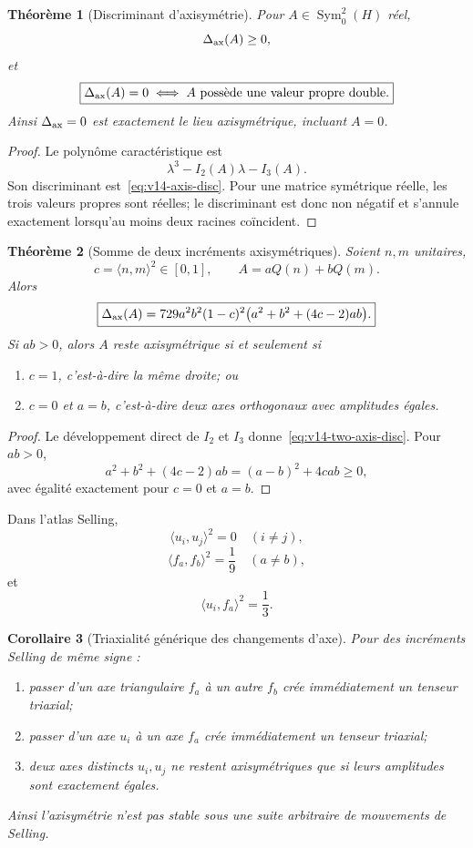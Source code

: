 \documentclass[11pt,a4paper]{article}
\newtheorem{theorem}{Théorème}[section]
\newtheorem{corollary}[theorem]{Corollaire}
\begin{document}
\begin{theorem}[Discriminant d'axisymétrie]\label{thm:v14-axis-disc}
Pour $A\in\operatorname{Sym}_0^2(H)$ réel,
\[
 \Delta_{\rm ax}(A)\ge0,
\]
et
\[
 \boxed{
 \Delta_{\rm ax}(A)=0
 \iff
 A\ \text{possède une valeur propre double}.}
\]
Ainsi $\Delta_{\rm ax}=0$ est exactement le lieu axisymétrique, incluant $A=0$.
\end{theorem}

\begin{proof}
Le polynôme caractéristique est
\[
 \lambda^3-I_2(A)\lambda-I_3(A).
\]
Son discriminant est~\eqref{eq:v14-axis-disc}. Pour une matrice symétrique réelle, les trois valeurs propres sont réelles; le discriminant est donc non négatif et s'annule exactement lorsqu'au moins deux racines coïncident.
\end{proof}

\begin{theorem}[Somme de deux incréments axisymétriques]\label{thm:v14-two-axis}
Soient $n,m$ unitaires,
\[
 c=\langle n,m\rangle^2\in[0,1],
\qquad
 A=aQ(n)+bQ(m).
\]
Alors
\begin{equation}\label{eq:v14-two-axis-disc}
 \boxed{
 \Delta_{\rm ax}(A)
 =
 729a^2b^2(1-c)^2
 \bigl(a^2+b^2+(4c-2)ab\bigr).}
\end{equation}
Si $ab>0$, alors $A$ reste axisymétrique si et seulement si
\begin{enumerate}[label=\textup{(\roman*)}]
\item $c=1$, c'est-à-dire la même droite; ou
\item $c=0$ et $a=b$, c'est-à-dire deux axes orthogonaux avec amplitudes égales.
\end{enumerate}
\end{theorem}

\begin{proof}
Le développement direct de $I_2$ et $I_3$ donne~\eqref{eq:v14-two-axis-disc}. Pour $ab>0$,
\[
 a^2+b^2+(4c-2)ab
 =(a-b)^2+4cab\ge0,
\]
avec égalité exactement pour $c=0$ et $a=b$.
\end{proof}

Dans l'atlas Selling,
\[
 \langle u_i,u_j\rangle^2=0\quad(i\ne j),
\]
\[
 \langle f_a,f_b\rangle^2=\frac19\quad(a\ne b),
\]
et
\[
 \langle u_i,f_a\rangle^2=\frac13.
\]

\begin{corollary}[Triaxialité générique des changements d'axe]\label{cor:v14-generic-triaxial}
Pour des incréments Selling de même signe :
\begin{enumerate}[label=\textup{(\roman*)}]
\item passer d'un axe triangulaire $f_a$ à un autre $f_b$ crée immédiatement un tenseur triaxial;
\item passer d'un axe $u_i$ à un axe $f_a$ crée immédiatement un tenseur triaxial;
\item deux axes distincts $u_i,u_j$ ne restent axisymétriques que si leurs amplitudes sont exactement égales.
\end{enumerate}
Ainsi l'axisymétrie n'est pas stable sous une suite arbitraire de mouvements de Selling.
\end{corollary}
\end{document}
